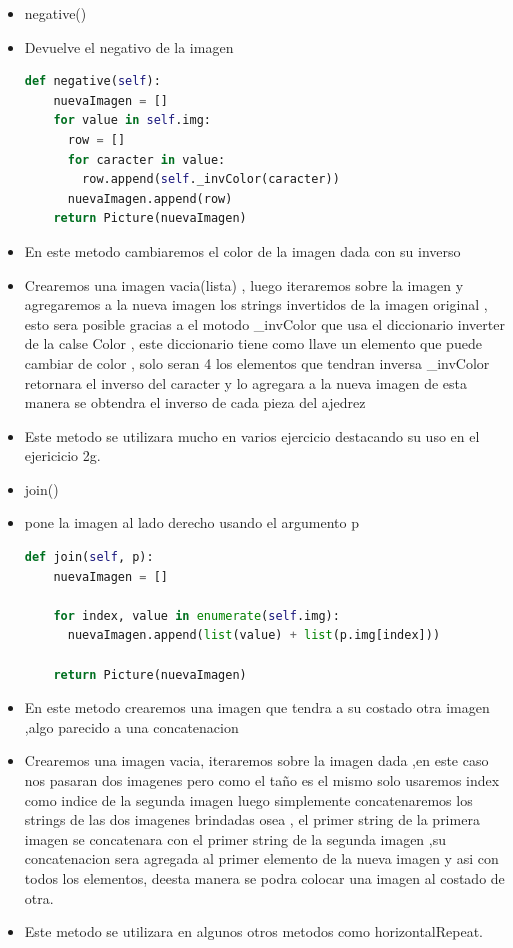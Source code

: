 \documentclass{article}
\begin{document}
\begin{itemize}
	\item negative()
		\item Devuelve el negativo de la imagen
		\begin{lstlisting}[language=Python, caption={negative}, float=H]
			def negative(self):
    nuevaImagen = []
    for value in self.img:
      row = []
      for caracter in value:
        row.append(self._invColor(caracter))
      nuevaImagen.append(row)    
    return Picture(nuevaImagen)
        \end{lstlisting}
		\item En este metodo cambiaremos el color de la imagen dada con su inverso
		\item Crearemos una imagen vacia(lista) , luego iteraremos sobre la imagen y agregaremos a la nueva imagen los strings invertidos de la 
		      imagen original , esto sera posible gracias a el motodo _invColor que usa el diccionario inverter de la calse Color , este diccionario tiene como
			  llave un elemento que puede cambiar de color , solo seran 4 los elementos que tendran inversa _invColor retornara el inverso del caracter y lo agregara a la nueva imagen
			  de esta manera se obtendra el inverso de cada pieza del ajedrez 
		\item Este metodo se utilizara mucho en varios ejercicio destacando su uso en el ejericicio 2g.
		
		\item join()
		\item pone la imagen al lado derecho usando el argumento p
		\begin{lstlisting}[language=Python, caption={Join}, float=H]
			def join(self, p):
    nuevaImagen = []

    for index, value in enumerate(self.img):
      nuevaImagen.append(list(value) + list(p.img[index]))

    return Picture(nuevaImagen)
        \end{lstlisting}
		\item En este metodo crearemos una imagen que tendra a su costado otra imagen ,algo parecido a una concatenacion
		\item Crearemos una imagen vacia, iteraremos sobre la imagen dada ,en este caso nos pasaran dos imagenes pero como el taño es el mismo solo usaremos index como indice de la segunda imagen
		      luego simplemente concatenaremos los strings de las dos imagenes brindadas osea , el primer string de la primera imagen se concatenara con el primer string de la segunda imagen ,su concatenacion sera 
			  agregada al primer elemento de la nueva imagen y asi con todos los elementos, deesta manera se podra colocar una imagen al costado de otra.  
     	\item Este metodo se utilizara en algunos otros metodos como horizontalRepeat.
     	

\end{itemize}
\end{document}
